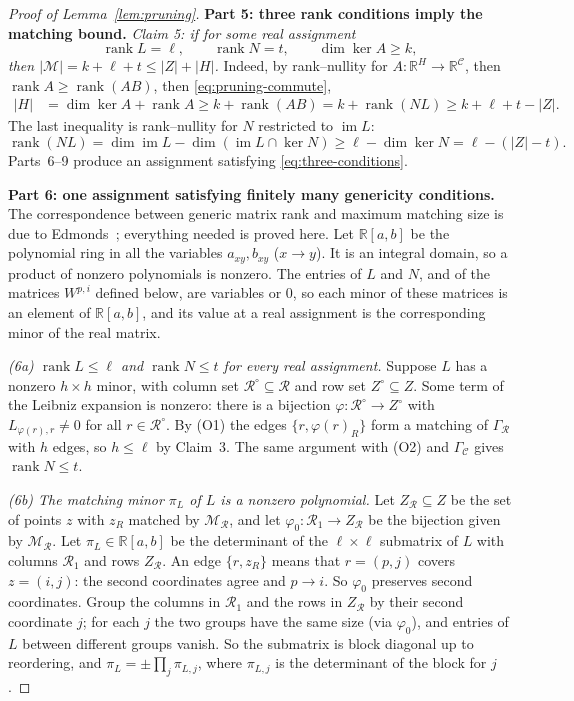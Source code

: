 \documentclass[11pt]{article}
\theoremstyle{remark}
\newcommand{\abs}[1]{\lvert #1\rvert}
\DeclareMathOperator{\rank}{rank}
\DeclareMathOperator{\im}{im}
\newcommand{\R}{\mathbb R}
\newcommand{\Step}[1]{\par\medskip\noindent\textbf{#1}\enspace}
\newcommand{\cR}{\mathcal R}
\newcommand{\cC}{\mathcal C}
\newcommand{\cM}{\mathcal M}
\begin{document}
\begin{proof}[Proof of Lemma~\ref{lem:pruning}]
\Step{Part 5: three rank conditions imply the matching bound.}
\emph{Claim 5: if for some real assignment}
\begin{equation}\label{eq:three-conditions}
 \rank L=\ell,\qquad \rank N=t,\qquad \dim\ker A\geq k,
\end{equation}
\emph{then $\abs{\cM}=k+\ell+t\le\abs Z+\abs H$.}
Indeed, by rank--nullity for $A:\R^H\to\R^{\cC}$, then
$\rank A\ge\rank(AB)$, then \eqref{eq:pruning-commute},
\begin{align}
 \abs H
 &=\dim\ker A+\rank A
 \geq k+\rank(AB)= k+\rank(NL)
 \geq k+\ell+t-\abs Z.
 \label{eq:pruning-rank-bound}
\end{align}
The last inequality is rank--nullity for $N$ restricted to $\im L$:
\[
 \rank(NL)
 =\dim\im L-\dim(\im L\cap\ker N)
 \geq\ell-\dim\ker N=\ell-(\abs Z-t).
\]
Parts~6--9 produce an assignment satisfying \eqref{eq:three-conditions}.

\Step{Part 6: one assignment satisfying finitely many genericity conditions.}
The correspondence between generic matrix rank and maximum matching size is
due to Edmonds~\cite[Section~5, Theorem~1]{Edmonds1967}; everything needed
is proved here. Let $\R[a,b]$ be the polynomial ring in all the variables
$a_{xy},b_{xy}$ ($x\to y$). It is an integral domain, so a product of
nonzero polynomials is nonzero. The entries of $L$ and $N$, and of the
matrices $W^{p,i}$ defined below, are variables or $0$, so each minor of
these matrices is an element of $\R[a,b]$, and its value at a real
assignment is the corresponding minor of the real matrix.

\smallskip\noindent\emph{(6a) $\rank L\le\ell$ and $\rank N\le t$ for every
real assignment.} Suppose $L$ has a nonzero $h\times h$ minor, with column
set $\cR^{\circ}\subseteq\cR$ and row set $Z^{\circ}\subseteq Z$. Some term
of the Leibniz expansion is nonzero: there is a bijection
$\varphi:\cR^{\circ}\to Z^{\circ}$ with $L_{\varphi(r),r}\ne0$ for all
$r\in\cR^{\circ}$. By (O1) the edges $\{r,\varphi(r)_R\}$ form a matching
of $\Gamma_{\cR}$ with $h$ edges, so $h\le\ell$ by Claim~3. The same
argument with (O2) and $\Gamma_{\cC}$ gives $\rank N\le t$.

\smallskip\noindent\emph{(6b) The matching minor $\pi_L$ of $L$ is a
nonzero polynomial.} Let $Z_{\cR}\subseteq Z$ be the set of points $z$ with
$z_R$ matched by $\cM_{\cR}$, and let $\varphi_0:\cR_1\to Z_{\cR}$ be the
bijection given by $\cM_{\cR}$. Let $\pi_L\in\R[a,b]$ be the determinant of
the $\ell\times\ell$ submatrix of $L$ with columns $\cR_1$ and rows
$Z_{\cR}$. An edge $\{r,z_R\}$ means that $r=(p,j)$ covers $z=(i,j)$: the
second coordinates agree and $p\to i$. So $\varphi_0$ preserves second
coordinates. Group the columns in $\cR_1$ and the rows in $Z_{\cR}$ by
their second coordinate $j$; for each $j$ the two groups have the same size
(via $\varphi_0$), and entries of $L$ between different groups vanish. So
the submatrix is block diagonal up to reordering, and
$\pi_L=\pm\prod_j\pi_{L,j}$, where $\pi_{L,j}$ is the determinant of the
block for $j$.


\end{proof}
\end{document}
